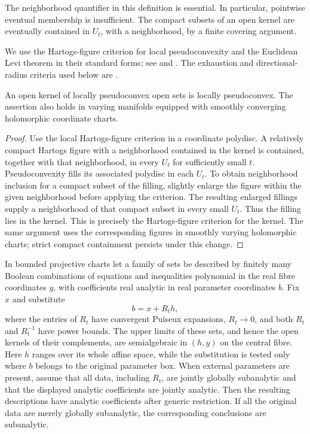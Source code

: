 The neighborhood quantifier in this definition is essential. In particular, pointwise eventual membership is insufficient. The compact subsets of an open kernel are eventually contained in $U_t$, with a neighborhood, by a finite covering argument.

We use the Hartogs-figure criterion for local pseudoconvexity and the Euclidean Levi theorem in their standard forms; see \cite[II.3.4 and II.3.7]{FritzscheGrauert2002} and \cite[VIII.9.11(a)]{DemaillyCADG}. The exhaustion and directional-radius criteria used below are \cite[I.7.2]{DemaillyCADG}.

\begin{lemma}
\label{lem:prep-kernel-pseudoconvexity}
An open kernel of locally pseudoconvex open sets is locally pseudoconvex. The assertion also holds in varying manifolds equipped with smoothly converging holomorphic coordinate charts.
\end{lemma}

\begin{proof}
Use the local Hartogs-figure criterion in a coordinate polydisc. A relatively compact Hartogs figure with a neighborhood contained in the kernel is contained, together with that neighborhood, in every $U_t$ for sufficiently small $t$. Pseudoconvexity fills its associated polydisc in each $U_t$. To obtain neighborhood inclusion for a compact subset of the filling, slightly enlarge the figure within the given neighborhood before applying the criterion. The resulting enlarged fillings supply a neighborhood of that compact subset in every small $U_t$. Thus the filling lies in the kernel. This is precisely the Hartogs-figure criterion for the kernel. The same argument uses the corresponding figures in smoothly varying holomorphic charts; strict compact containment persists under this change.
\end{proof}

\begin{lemma}\label{lem:prep-finite-jet-specialization}
In bounded projective charts let a family of sets be described by finitely many Boolean combinations of equations and inequalities polynomial in the real fibre coordinates $y$, with coefficients real analytic in real parameter coordinates $b$. Fix $x$ and substitute
\[
 b=x+R_t h,
\]
where the entries of $R_t$ have convergent Puiseux expansions, $R_t\to0$, and both $R_t$ and $R_t^{-1}$ have power bounds. The upper limits of these sets, and hence the open kernels of their complements, are semialgebraic in $(h,y)$ on the central fibre. Here $h$ ranges over its whole affine space, while the substitution is tested only where $b$ belongs to the original parameter box. When external parameters are present, assume that all data, including $R_t$, are jointly globally subanalytic and that the displayed analytic coefficients are jointly analytic. Then the resulting descriptions have analytic coefficients after generic restriction. If all the original data are merely globally subanalytic, the corresponding conclusions are subanalytic.
\end{lemma}

